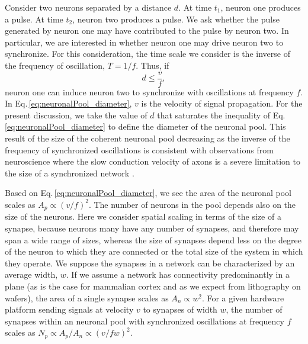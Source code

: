 \documentclass[aip,amsmath,amssymb,reprint,nofootinbib]{revtex4-1}
\begin{document}
Consider two neurons separated by a distance $d$. At time $t_1$, neuron one produces a pulse. At time $t_2$, neuron two produces a pulse. We ask whether the pulse generated by neuron one may have contributed to the pulse by neuron two. In particular, we are interested in whether neuron one may drive neuron two to synchronize. For this consideration, the time scale we consider is the inverse of the frequency of oscillation, $T = 1/f$. Thus, if 
\begin{equation}
\label{eq:neuronalPool_diameter}
d \le \frac{v}{f},
\end{equation} 
neuron one can induce neuron two to synchronize with oscillations at frequency $f$. In Eq.\,\ref{eq:neuronalPool_diameter}, $v$ is the velocity of signal propagation. For the present discussion, we take the value of $d$ that saturates the inequality of Eq.\,\ref{eq:neuronalPool_diameter} to define the diameter of the neuronal pool. This result of the size of the coherent neuronal pool decreasing as the inverse of the frequency of synchronized oscillations \cite{lued1997} is consistent with observations from neuroscience \cite{stra1999} where the slow conduction velocity of axons is a severe limitation to the size of a synchronized network \cite{budr2004,bu2006,buwa2012}. 

Based on Eq.\,\ref{eq:neuronalPool_diameter}, we see the area of the neuronal pool scales as $A_p \propto (v/f)^2$. The number of neurons in the pool depends also on the size of the neurons. Here we consider spatial scaling in terms of the size of a synapse, because neurons many have any number of synapses, and therefore may span a wide range of sizes, whereas the size of synapses depend less on the degree of the neuron to which they are connected or the total size of the system in which they operate. We suppose the synapses in a network can be characterized by an average width, $w$. If we assume a network has connectivity predominantly in a plane (as is the case for mammalian cortex and as we expect from lithography on wafers), the area of a single synapse scales as $A_n \propto w^2$. For a given hardware platform sending signals at velocity $v$ to synapses of width $w$, the number of synapses within an neuronal pool with synchronized oscillations at frequency $f$ scales as $N_p \propto A_p/A_n \propto (v/fw)^2$. 
\end{document}

